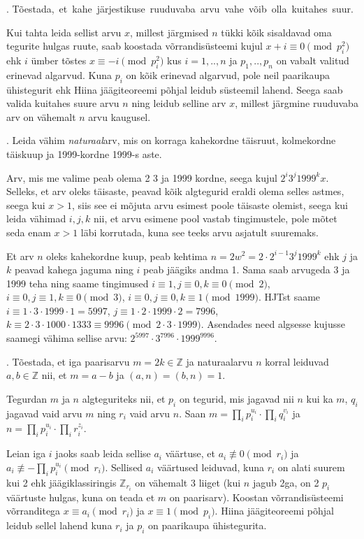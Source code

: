 \documentclass[a4paper, 10pt]{article}
\newcommand{\Z}{\mathbb{Z}}
\begin{document}
. \mbox{Tõestada, et kahe järjestikuse ruuduvaba arvu vahe võib olla kuitahes suur.}

\bigskip
Kui tahta leida sellist arvu $x$, millest järgmised $n$ tükki kõik sisaldavad oma tegurite hulgas ruute, saab koostada võrrandisüsteemi kujul $x+i\equiv 0\pmod {p_i^2}$ ehk $i$ ümber tõstes $x\equiv -i\pmod {p_i^2}$ kus $i=1,..,n$ ja $p_1,..,p_n$ on vabalt valitud erinevad algarvud. Kuna $p_i$ on kõik erinevad algarvud, pole neil paarikaupa ühistegurit ehk Hiina jäägiteoreemi põhjal leidub süsteemil lahend. Seega saab valida kuitahes suure arvu $n$ ning leidub selline arv $x$, millest järgmine ruuduvaba arv on vähemalt $n$ arvu kaugusel.
\bigskip

. Leida vähim \emph{naturaal}arv, mis on korraga kahekordne täisruut, kolmekordne täiskuup ja 1999-kordne 1999-s aste. 

\bigskip

Arv, mis me valime peab olema 2 3 ja 1999 kordne, seega kujul $2^i3^j1999^kx$. Selleks, et arv oleks täisaste, peavad kõik algtegurid eraldi olema selles astmes, seega kui $x>1$, siis see ei mõjuta arvu esimest poole täisaste olemist, seega kui leida vähimad $i,j,k$ nii, et arvu esimene pool vastab tingimustele, pole mõtet seda enam $x>1$ läbi korrutada, kuna see teeks arvu asjatult suuremaks.

Et arv $n$ oleks kahekordne kuup, peab kehtima $n=2w^2=2\cdot2^{i-1}3^j1999^k$ ehk $j$ ja $k$ peavad kahega jaguma ning $i$ peab jäägiks andma 1. Sama saab arvugeda 3 ja 1999 teha ning saame tingimused $i\equiv 1,j\equiv0,k\equiv0 \pmod{2}$, $i\equiv 0,j\equiv1,k\equiv0 \pmod{3}$, $i\equiv 0,j\equiv0,k\equiv1 \pmod{1999}$. HJTst saame $i\equiv 1\cdot 3\cdot 1999\cdot 1=5997$, $j \equiv 1\cdot 2\cdot 1999\cdot 2=7996$, $k \equiv 2\cdot 3\cdot 1000\cdot 1333\equiv 9996 \pmod{2\cdot3\cdot 1999}$. Asendades need algsesse kujusse saamegi vähima sellise arvu: $2^{5997}\cdot3^{7996}\cdot1999^{9996}$.

\bigskip
\pagebreak

. Tõestada, et iga paarisarvu $m=2k\in\Z$ ja naturaalarvu $n$ korral leiduvad $a,b\in\Z$ nii, et $m=a-b$ ja $(a,n) = (b,n) = 1$. 

\bigskip
Tegurdan $m$ ja $n$ algteguriteks nii, et $p_i$ on tegurid, mis jagavad nii $n$ kui ka $m$, $q_i$ jagavad vaid arvu $m$ ning $r_i$ vaid arvu $n$. Saan $m=\prod_ip_i^{u_i}\cdot\prod_iq_i^{v_i}$ ja $n=\prod_ip_i^{u_i}\cdot\prod_ir_i^{z_i}$. 

Leian iga $i$ jaoks saab leida sellise $a_i$ väärtuse, et $a_i\not\equiv0\pmod{r_i}$ ja $a_i\not\equiv-\prod_ip_i^{u_i}\pmod{r_i}$. Sellised $a_i$ väärtused leiduvad, kuna $r_i$ on alati suurem kui 2 ehk jäägiklassiringis $\Z_{r_i}$ on vähemalt 3 liiget (kui $n$ jagub 2ga, on 2 $p_i$ väärtuste hulgas, kuna on teada et $m$ on paarisarv). Koostan võrrandisüsteemi võrranditega $x\equiv a_i\pmod{r_i}$ ja $x\equiv1\pmod{p_i}$. Hiina jäägiteoreemi põhjal leidub sellel lahend kuna $r_i$ ja $p_i$ on paarikaupa ühistegurita.
\end{document}
